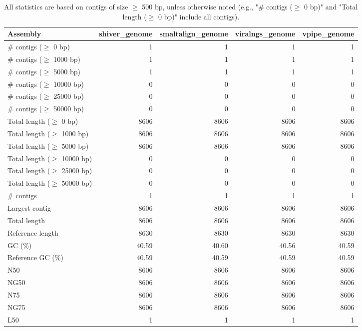 \documentclass[12pt,a4paper]{article}
\begin{document}
\begin{table}[ht]
\begin{center}
\caption{All statistics are based on contigs of size $\geq$ 500 bp, unless otherwise noted (e.g., "\# contigs ($\geq$ 0 bp)" and "Total length ($\geq$ 0 bp)" include all contigs).}
\begin{tabular}{|l*{4}{|r}|}
\hline
Assembly & shiver\_genome & smaltalign\_genome & viralngs\_genome & vpipe\_genome \\ \hline
\# contigs ($\geq$ 0 bp) & 1 & 1 & 1 & 1 \\ \hline
\# contigs ($\geq$ 1000 bp) & 1 & 1 & 1 & 1 \\ \hline
\# contigs ($\geq$ 5000 bp) & 1 & 1 & 1 & 1 \\ \hline
\# contigs ($\geq$ 10000 bp) & 0 & 0 & 0 & 0 \\ \hline
\# contigs ($\geq$ 25000 bp) & 0 & 0 & 0 & 0 \\ \hline
\# contigs ($\geq$ 50000 bp) & 0 & 0 & 0 & 0 \\ \hline
Total length ($\geq$ 0 bp) & 8606 & 8606 & 8606 & 8606 \\ \hline
Total length ($\geq$ 1000 bp) & 8606 & 8606 & 8606 & 8606 \\ \hline
Total length ($\geq$ 5000 bp) & 8606 & 8606 & 8606 & 8606 \\ \hline
Total length ($\geq$ 10000 bp) & 0 & 0 & 0 & 0 \\ \hline
Total length ($\geq$ 25000 bp) & 0 & 0 & 0 & 0 \\ \hline
Total length ($\geq$ 50000 bp) & 0 & 0 & 0 & 0 \\ \hline
\# contigs & 1 & 1 & 1 & 1 \\ \hline
Largest contig & 8606 & 8606 & 8606 & 8606 \\ \hline
Total length & 8606 & 8606 & 8606 & 8606 \\ \hline
Reference length & 8630 & 8630 & 8630 & 8630 \\ \hline
GC (\%) & 40.59 & 40.60 & 40.56 & 40.59 \\ \hline
Reference GC (\%) & 40.59 & 40.59 & 40.59 & 40.59 \\ \hline
N50 & 8606 & 8606 & 8606 & 8606 \\ \hline
NG50 & 8606 & 8606 & 8606 & 8606 \\ \hline
N75 & 8606 & 8606 & 8606 & 8606 \\ \hline
NG75 & 8606 & 8606 & 8606 & 8606 \\ \hline
L50 & 1 & 1 & 1 & 1 \\ \hline

\end{tabular}
\end{center}
\end{table}
\end{document}
